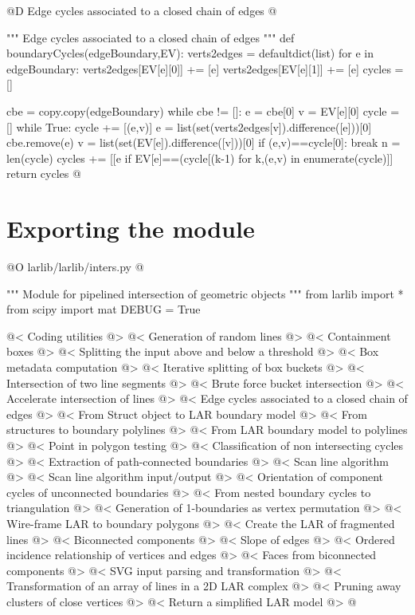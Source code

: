 \documentclass[11pt,oneside]{article}    %
\begin{document}
@D Edge cycles associated to a closed chain of edges
@{""" Edge cycles associated to a closed chain of edges """
def boundaryCycles(edgeBoundary,EV):
    verts2edges = defaultdict(list)
    for e in edgeBoundary:
        verts2edges[EV[e][0]] += [e]
        verts2edges[EV[e][1]] += [e]
    cycles = []
    
    cbe = copy.copy(edgeBoundary)
    while cbe != []:
        e = cbe[0]
        v = EV[e][0]
        cycle = []
        while True:
            cycle += [(e,v)]
            e = list(set(verts2edges[v]).difference([e]))[0]
            cbe.remove(e)
            v = list(set(EV[e]).difference([v]))[0]
            if (e,v)==cycle[0]:
                break
        n = len(cycle)
        cycles += [[e if EV[e]==(cycle[(k-1)%
            for k,(e,v) in enumerate(cycle)]]
    return cycles
@}




\section{Exporting the module}

@O larlib/larlib/inters.py
@{""" Module for pipelined intersection of geometric objects """
from larlib import *
from scipy import mat
DEBUG = True

@< Coding utilities @>
@< Generation of random lines @>
@< Containment boxes @>
@< Splitting the input above and below a threshold @>
@< Box metadata computation @>
@< Iterative splitting of box buckets @>
@< Intersection of two line segments @>
@< Brute force bucket intersection @>
@< Accelerate intersection of lines @>
@< Edge cycles associated to a closed chain of edges @>
@< From Struct object to LAR boundary model @>
@< From structures to boundary polylines @>
@< From LAR boundary model to polylines @>
@< Point in polygon testing @>
@< Classification of non intersecting cycles @>
@< Extraction of path-connected boundaries @>
@< Scan line algorithm @>
@< Scan line algorithm input/output @>
@< Orientation of component cycles of unconnected boundaries @>
@< From nested boundary cycles to triangulation @>
@< Generation of 1-boundaries as vertex permutation @>
@< Wire-frame LAR to boundary polygons @>
@< Create the LAR of fragmented lines @>
@< Biconnected components @>
@< Slope of edges @>
@< Ordered incidence relationship of vertices and edges @>
@< Faces from biconnected components @>
@< SVG input parsing and transformation @>
@< Transformation of an array of lines in a 2D LAR complex @>
@< Pruning away clusters of close vertices @>
@< Return a simplified LAR model @>
@}
\end{document}
